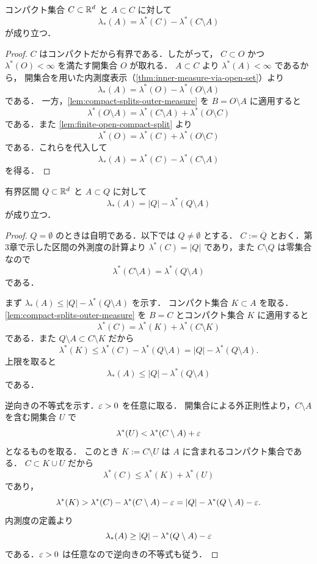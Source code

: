 \begin{corollary}[コンパクト集合を用いた内測度表示]\label{cor:inner-measure-via-compact-set}
コンパクト集合 $C\subset\mathbb R^d$ と $A\subset C$ に対して
\[
\lambda_*(A)
=
\lambda^*(C)-\lambda^*(C\setminus A)
\]
が成り立つ．
\end{corollary}
\begin{proof}
$C$ はコンパクトだから有界である．したがって，
$C\subset O$ かつ $\lambda^*(O)<\infty$ を満たす開集合 $O$ が取れる．
$A\subset C$ より $\lambda^*(A)<\infty$ であるから，
開集合を用いた内測度表示（\cref{thm:inner-measure-via-open-set}）より
\[
\lambda_*(A)=\lambda^*(O)-\lambda^*(O\setminus A)
\]
である．
一方，\cref{lem:compact-splits-outer-measure} を $B=O\setminus A$ に適用すると
\[
\lambda^*(O\setminus A)
=
\lambda^*(C\setminus A)+\lambda^*(O\setminus C)
\]
である．また \cref{lem:finite-open-compact-split} より
\[
\lambda^*(O)=\lambda^*(C)+\lambda^*(O\setminus C)
\]
である．これらを代入して
\[
\lambda_*(A)
=
\lambda^*(C)-\lambda^*(C\setminus A)
\]
を得る．
\end{proof}

\fi

\begin{theorem}[区間を用いた内測度表示]\label{thm:inner-measure-via-interval}\label{cor:inner-measure-via-interval}
有界区間 $Q\subset\mathbb R^d$ と $A\subset Q$ に対して
\[
\lambda_*(A)
=
|Q|-\lambda^*(Q\setminus A)
\]
が成り立つ．
\end{theorem}
\begin{proof}
$Q=\emptyset$ のときは自明である．以下では $Q\neq\emptyset$ とする．
$C:=\overline Q$ とおく．第3章で示した区間の外測度の計算より
$\lambda^*(C)=|Q|$ であり，また $C\setminus Q$ は零集合なので
\[
\lambda^*(C\setminus A)=\lambda^*(Q\setminus A)
\]
である．

まず $\lambda_*(A)\le |Q|-\lambda^*(Q\setminus A)$ を示す．
コンパクト集合 $K\subset A$ を取る．
\cref{lem:compact-splits-outer-measure} を $B=C$ とコンパクト集合 $K$ に適用すると
\[
\lambda^*(C)=\lambda^*(K)+\lambda^*(C\setminus K)
\]
である．また $Q\setminus A\subset C\setminus K$ だから
\[
\lambda^*(K)
\le
\lambda^*(C)-\lambda^*(Q\setminus A)
=
|Q|-\lambda^*(Q\setminus A).
\]
上限を取ると
\[
\lambda_*(A)\le |Q|-\lambda^*(Q\setminus A)
\]
である．

逆向きの不等式を示す．$\varepsilon>0$ を任意に取る．
開集合による外正則性より，$C\setminus A$ を含む開集合 $U$ で
\[
\lambda^*(U)<\lambda^*(C\setminus A)+\varepsilon
\]
となるものを取る．
このとき $K:=C\setminus U$ は $A$ に含まれるコンパクト集合である．
$C\subset K\cup U$ だから
\[
\lambda^*(C)\le \lambda^*(K)+\lambda^*(U)
\]
であり，
\[
\lambda^*(K)
>
\lambda^*(C)-\lambda^*(C\setminus A)-\varepsilon
=
|Q|-\lambda^*(Q\setminus A)-\varepsilon.
\]
内測度の定義より
\[
\lambda_*(A)\ge |Q|-\lambda^*(Q\setminus A)-\varepsilon
\]
である．$\varepsilon>0$ は任意なので逆向きの不等式も従う．
\end{proof}


